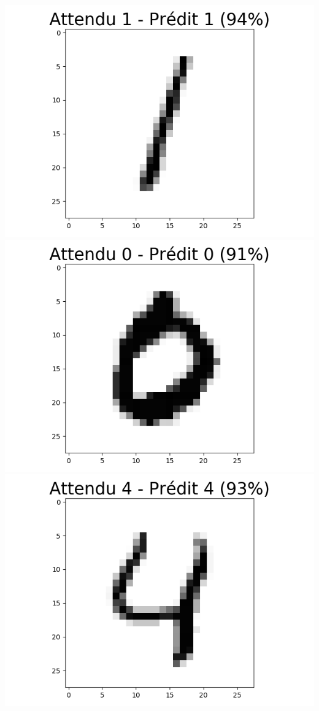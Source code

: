 \documentclass[11pt,class=report,crop=false]{standalone}
\begin{document}
\begin{center}
\includegraphics[scale=\myscale,scale=0.20]{figures/tf2-chiffre-test-result-2}
\includegraphics[scale=\myscale,scale=0.20]{figures/tf2-chiffre-test-result-3}
\includegraphics[scale=\myscale,scale=0.20]{figures/tf2-chiffre-test-result-4}
\end{center}
\end{document}
